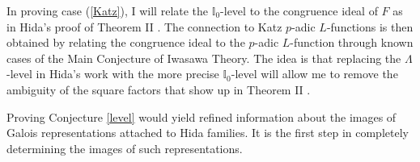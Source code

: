 \documentclass[12pt]{article}
\newcommand{\I}{\mathbb{I}}
\newcommand{\OK}{\ensuremath{\mathcal{O}}}
\newcommand{\p}{\mathfrak{p}}
\newcommand{\Q}{\mathbb{Q}}
\theoremstyle{definition}
\DeclareMathOperator{\GL}{GL}
\DeclareMathOperator{\im}{Im}
\begin{document}
In proving case (\ref{Katz}), I will relate the $\I_0$-level to the congruence ideal of $F$ as in Hida's proof of Theorem II \cite{Hida15}.  The connection to Katz $p$-adic $L$-functions is then obtained by relating the congruence ideal to the $p$-adic $L$-function through known cases of the Main Conjecture of Iwasawa Theory.  The idea is that replacing the $\Lambda$-level in Hida's work with the more precise $\I_0$-level will allow me to remove the ambiguity of the square factors that show up in Theorem II \cite{Hida15}.

Proving Conjecture \ref{level} would yield refined information about the images of Galois representations attached to Hida families.  It is the first step in completely determining the images of such representations.  


\end{document}
